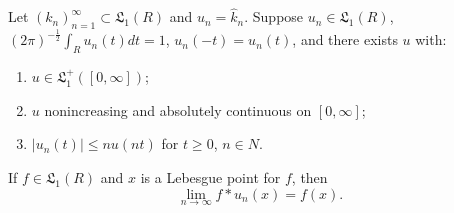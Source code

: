 Let $(k_n)_{n=1}^{\infty} \subset \mathfrak{L}_1(R)$ and $u_n = \hat{k}_n$. Suppose $u_n \in \mathfrak{L}_1(R)$, $(2\pi)^{-\frac{1}{2}}\int_R u_n(t)dt = 1$, $u_n(-t) = u_n(t)$, and there exists $u$ with:
\begin{enumerate}
\item[(i)] $u \in \mathfrak{L}_1^+([0,\infty])$;
\item[(ii)] $u$ nonincreasing and absolutely continuous on $[0,\infty]$;
\item[(iii)] $|u_n(t)| \leq n u(nt)$ for $t \geq 0$, $n \in N$.
\end{enumerate}
If $f \in \mathfrak{L}_1(R)$ and $x$ is a Lebesgue point for $f$, then
$$\lim_{n \to \infty} f * u_n(x) = f(x).$$
